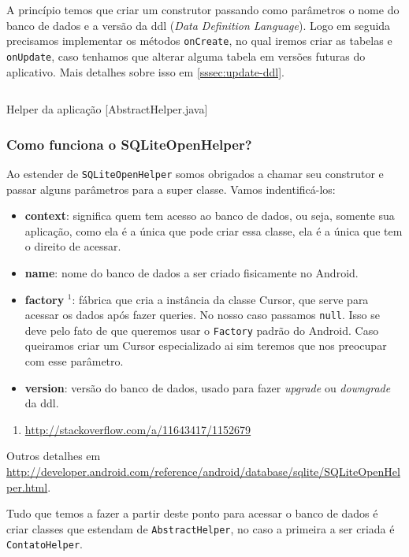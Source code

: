 A princípio temos que criar um construtor passando como parâmetros o
nome do banco de dados e a versão da \gls{ddl} (\emph{Data Definition
Language}). Logo em seguida precisamos implementar os métodos
\texttt{onCreate}, no qual iremos criar as tabelas e \texttt{onUpdate},
caso tenhamos que alterar alguma tabela em versões futuras do
aplicativo. Mais detalhes sobre isso em \ref{sssec:update-ddl}.

\begin{listing}[H]
  \inputminted[linenos=true,frame=bottomline,tabsize=3]{ java }{ source/AbstractHelper-1.java }
  \caption{Helper da aplicação [AbstractHelper.java]}
\end{listing}

\subsubsection{Como funciona o SQLiteOpenHelper?}

Ao estender de \texttt{SQLiteOpenHelper} somos obrigados a chamar seu
construtor e passar alguns parâmetros para a super classe. Vamos
indentificá-los:

\begin{itemize}
\item
  \textbf{context}: significa quem tem acesso ao banco de dados, ou
  seja, somente sua aplicação, como ela é a única que pode criar essa
  classe, ela é a única que tem o direito de acessar.
\item
  \textbf{name}: nome do banco de dados a ser criado fisicamente no
  Android.
\item
  \textbf{factory} $^1$: fábrica que cria a instância da classe Cursor,
  que serve para acessar os dados após fazer queries. No nosso caso
  passamos \texttt{null}. Isso se deve pelo fato de que queremos usar o
  \texttt{Factory} padrão do Android. Caso queiramos criar um Cursor
  especializado ai sim teremos que nos preocupar com esse parâmetro.
\item
  \textbf{version}: versão do banco de dados, usado para fazer
  \emph{upgrade} ou \emph{downgrade} da \gls{ddl}.
\end{itemize}
\begin{enumerate}[1.]
\item
  \url{http://stackoverflow.com/a/11643417/1152679}
\end{enumerate}
Outros detalhes em
\url{http://developer.android.com/reference/android/database/sqlite/SQLiteOpenHelper.html}.

Tudo que temos a fazer a partir deste ponto para acessar o banco de
dados é criar classes que estendam de \texttt{AbstractHelper}, no caso a
primeira a ser criada é \texttt{ContatoHelper}.


